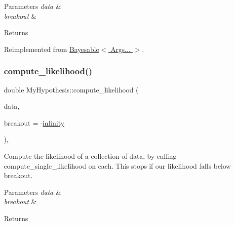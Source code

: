 \begin{DoxyParams}{Parameters}
{\em data} & \\
\hline
{\em breakout} & \\
\hline
\end{DoxyParams}
\begin{DoxyReturn}{Returns}

\end{DoxyReturn}


Reimplemented from \hyperlink{class_bayesable_af9547335ae15a5068b10d29aee5056ae}{Bayesable$<$ Args... $>$}.

\mbox{\label{class_my_hypothesis_a9caaf0511be161a52f7e93c2086374bc}} 
\subsubsection{\texorpdfstring{compute\+\_\+likelihood()}{compute\_likelihood()}\hspace{0.1cm}{\footnotesize\ttfamily [2/2]}}
{\footnotesize\ttfamily double My\+Hypothesis\+::compute\+\_\+likelihood (\begin{DoxyParamCaption}\item[{const \hyperlink{class_bayesable_a70a593a67c7d43239ecc06bb4fd06a6b}{t\+\_\+data} \&}]{data,  }\item[{const double}]{breakout = {\ttfamily -\/\hyperlink{_numerics_8h_a1bb1e42ae1b40cad6e99da0aab8a5576}{infinity}} }\end{DoxyParamCaption})\hspace{0.3cm}{\ttfamily [inline]}, {\ttfamily [virtual]}}



Compute the likelihood of a collection of data, by calling compute\+\_\+single\+\_\+likelihood on each. This stops if our likelihood falls below breakout. 


\begin{DoxyParams}{Parameters}
{\em data} & \\
\hline
{\em breakout} & \\
\hline
\end{DoxyParams}
\begin{DoxyReturn}{Returns}

\end{DoxyReturn}


